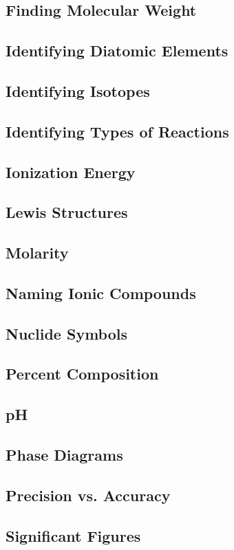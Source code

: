 \documentclass[10pt, roman]{article}
\begin{document}
\subsection{Finding Molecular Weight}
\subsection{Identifying Diatomic Elements}
\subsection{Identifying Isotopes}
\subsection{Identifying Types of Reactions}
\subsection{Ionization Energy}
\subsection{Lewis Structures}
\subsection{Molarity}
\subsection{Naming Ionic Compounds}
\subsection{Nuclide Symbols}
\subsection{Percent Composition}
\subsection{pH}
\subsection{Phase Diagrams}
\subsection{Precision vs. Accuracy}
\subsection{Significant Figures}
\end{document}
